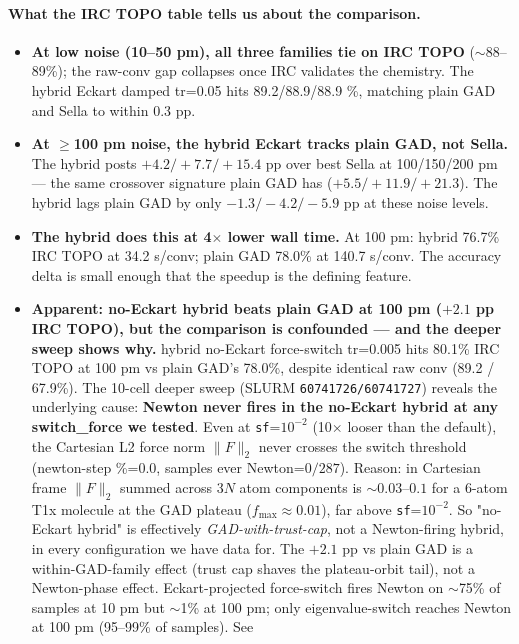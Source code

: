 \documentclass[11pt]{article}
\begin{document}
\paragraph{What the IRC TOPO table tells us about the comparison.}
\begin{itemize}[leftmargin=1.5em, itemsep=0.05em]
\item \textbf{At low noise (10--50 pm), all three families tie on IRC
  TOPO} ($\sim$88--89\%); the raw-conv gap collapses once IRC validates
  the chemistry. The hybrid Eckart damped tr=0.05 hits 89.2/88.9/88.9 \%,
  matching plain GAD and Sella to within 0.3 pp.
\item \textbf{At $\ge$100 pm noise, the hybrid Eckart tracks plain GAD,
  not Sella.} The hybrid posts $+4.2 / +7.7 / +15.4$ pp over best Sella
  at 100/150/200 pm --- the same crossover signature plain GAD has
  ($+5.5 / +11.9 / +21.3$). The hybrid lags plain GAD by only
  $-1.3 / -4.2 / -5.9$ pp at these noise levels.
\item \textbf{The hybrid does this at 4$\times$ lower wall time.} At 100
  pm: hybrid 76.7\% IRC TOPO at 34.2 s/conv; plain GAD 78.0\% at 140.7
  s/conv. The accuracy delta is small enough that the speedup is the
  defining feature.
\item \textbf{Apparent: no-Eckart hybrid beats plain GAD at 100 pm
  ($\mathbf{+2.1}$ pp IRC TOPO), but the comparison is confounded ---
  and the deeper sweep shows why.} hybrid no-Eckart force-switch
  tr=0.005 hits 80.1\% IRC TOPO at 100 pm vs plain GAD's 78.0\%,
  despite identical raw conv (89.2 / 67.9\%). The 10-cell deeper sweep
  (SLURM \texttt{60741726/60741727}) reveals the underlying cause:
  \textbf{Newton never fires in the no-Eckart hybrid at any
  switch\_force we tested}. Even at \texttt{sf}=$10^{-2}$ (10$\times$
  looser than the default), the Cartesian L2 force norm $\|F\|_2$ never
  crosses the switch threshold (newton-step \%=$0.0$, samples ever
  Newton=$0/287$). Reason: in Cartesian frame $\|F\|_2$ summed across
  $3N$ atom components is $\sim 0.03$--$0.1$ for a 6-atom T1x molecule
  at the GAD plateau ($f_{\max}\!\approx\!0.01$), far above
  \texttt{sf}=$10^{-2}$. So "no-Eckart hybrid" is effectively
  \emph{GAD-with-trust-cap}, not a Newton-firing hybrid, in every
  configuration we have data for. The $+2.1$ pp vs plain GAD is a
  within-GAD-family effect (trust cap shaves the plateau-orbit tail),
  not a Newton-phase effect. Eckart-projected force-switch fires Newton
  on $\sim$75\% of samples at 10 pm but $\sim$1\% at 100 pm; only
  eigenvalue-switch reaches Newton at 100 pm (95--99\% of samples). See

\end{itemize}
\end{document}
